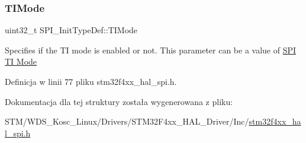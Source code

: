 \subsubsection{\texorpdfstring{T\+I\+Mode}{TIMode}}
{\footnotesize\ttfamily uint32\+\_\+t S\+P\+I\+\_\+\+Init\+Type\+Def\+::\+T\+I\+Mode}

Specifies if the TI mode is enabled or not. This parameter can be a value of \hyperlink{group___s_p_i___t_i__mode}{S\+PI TI Mode} 

Definicja w linii 77 pliku stm32f4xx\+\_\+hal\+\_\+spi.\+h.



Dokumentacja dla tej struktury została wygenerowana z pliku\+:\begin{DoxyCompactItemize}
\item 
S\+T\+M/\+W\+D\+S\+\_\+\+Kosc\+\_\+\+Linux/\+Drivers/\+S\+T\+M32\+F4xx\+\_\+\+H\+A\+L\+\_\+\+Driver/\+Inc/\hyperlink{stm32f4xx__hal__spi_8h}{stm32f4xx\+\_\+hal\+\_\+spi.\+h}\end{DoxyCompactItemize}
